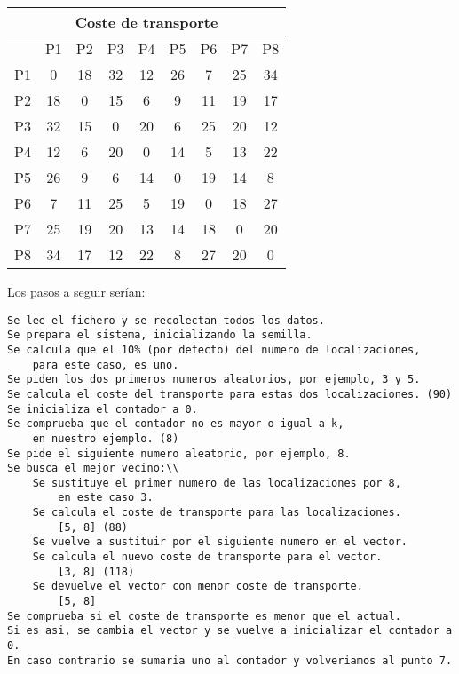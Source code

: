 \begin{center}
	\begin{tabular}{|c||c|c|c|c|c|c|c|c|} \hline
		\multicolumn{9}{|c|}{Coste de transporte} \\ \hline
		   & P1 & P2 & P3 & P4 & P5 & P6 & P7 & P8\\ \hline \hline
		P1 & 0  & 18 & 32 & 12 & 26 & 7  & 25 & 34\\ \hline
		P2 & 18 & 0  & 15 & 6  & 9  & 11 & 19 & 17\\ \hline
		P3 & 32 & 15 & 0  & 20 & 6  & 25 & 20 & 12\\ \hline
		P4 & 12 & 6  & 20 & 0  & 14 & 5  & 13 & 22\\ \hline
		P5 & 26 & 9  & 6  & 14 & 0  & 19 & 14 & 8\\ \hline
		P6 & 7  & 11 & 25 & 5  & 19 & 0  & 18 & 27\\ \hline
		P7 & 25 & 19 & 20 & 13 & 14 & 18 & 0  & 20\\ \hline
		P8 & 34 & 17 & 12 & 22 & 8  & 27 & 20 & 0\\ \hline
	\end{tabular}
\end{center}

Los pasos a seguir serían:

\begin{adjustbox}{max width=\textwidth}
\begin{lstlisting}
Se lee el fichero y se recolectan todos los datos.
Se prepara el sistema, inicializando la semilla. 
Se calcula que el 10% (por defecto) del numero de localizaciones, 
	para este caso, es uno.
Se piden los dos primeros numeros aleatorios, por ejemplo, 3 y 5.
Se calcula el coste del transporte para estas dos localizaciones. (90)
Se inicializa el contador a 0.
Se comprueba que el contador no es mayor o igual a k,
	en nuestro ejemplo. (8)
Se pide el siguiente numero aleatorio, por ejemplo, 8.
Se busca el mejor vecino:\\
	Se sustituye el primer numero de las localizaciones por 8, 
		en este caso 3.
	Se calcula el coste de transporte para las localizaciones. 
		[5, 8] (88)
	Se vuelve a sustituir por el siguiente numero en el vector.
	Se calcula el nuevo coste de transporte para el vector. 
		[3, 8] (118)
	Se devuelve el vector con menor coste de transporte. 
		[5, 8]
Se comprueba si el coste de transporte es menor que el actual.
Si es asi, se cambia el vector y se vuelve a inicializar el contador a 0.
En caso contrario se sumaria uno al contador y volveriamos al punto 7.
\end{lstlisting}
\end{adjustbox}

